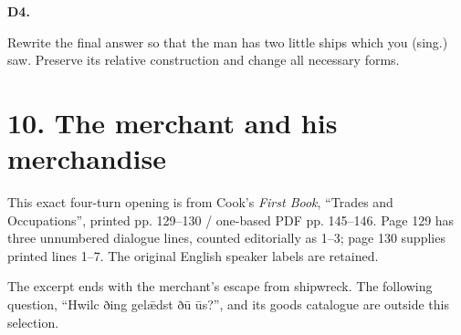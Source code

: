 \par\begin{minipage}{\linewidth}\raggedright
\textbf{D4.}

Rewrite the final answer so that the man has two little ships which you (sing.) saw. Preserve its relative construction and change all necessary forms.

\end{minipage}\par\addvspace{4pt}

\section*{10. The merchant and his merchandise}

This exact four-turn opening is from Cook’s \emph{First Book}, “Trades and Occupations”, printed pp. 129–130 /\allowbreak{} one-based PDF pp. 145–146. Page 129 has three unnumbered dialogue lines, counted editorially as 1–3; page 130 supplies printed lines 1–7. The original English speaker labels are retained.

\par\begin{minipage}{\linewidth}\raggedright




\end{minipage}\par
The excerpt ends with the merchant’s escape from shipwreck. The following question, “Hwilc ðing gelǣdst ðū ūs?”, and its goods catalogue are outside this selection.

